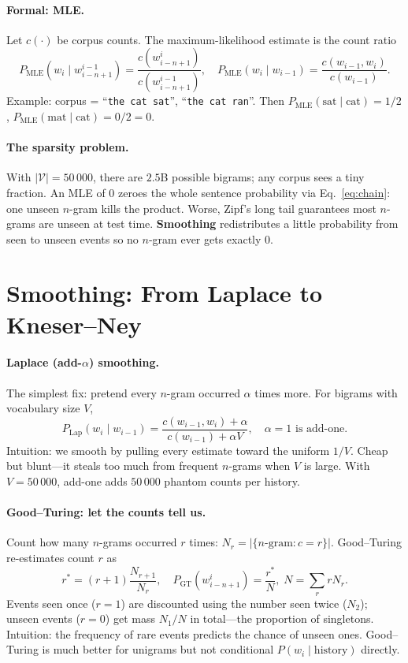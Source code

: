\paragraph{Formal: MLE.} Let $c(\cdot)$ be corpus counts. The maximum-likelihood estimate is the count ratio
\begin{equation}
P_{\text{MLE}}(w_{i}\mid w_{i-n+1}^{i-1})=\frac{c(w_{i-n+1}^{i})}{c(w_{i-n+1}^{i-1})},\quad
P_{\text{MLE}}(w_{i}\mid w_{i-1})=\frac{c(w_{i-1},w_{i})}{c(w_{i-1})}.
\label{eq:mle-ngram}
\end{equation}
Example: corpus = ``\texttt{the cat sat}'', ``\texttt{the cat ran}''. Then $P_{\text{MLE}}(\text{sat}\mid\text{cat})=1/2$, $P_{\text{MLE}}(\text{mat}\mid\text{cat})=0/2=0$.
\paragraph{The sparsity problem.} With $|\mathcal{V}|=50\,000$, there are $2.5$B possible bigrams; any corpus sees a tiny fraction. An MLE of $0$ zeroes the whole sentence probability via Eq.~\eqref{eq:chain}: one unseen $n$-gram kills the product. Worse, Zipf's long tail guarantees most $n$-grams are unseen at test time. \textbf{Smoothing} redistributes a little probability from seen to unseen events so no $n$-gram ever gets exactly $0$.
\section{Smoothing: From Laplace to Kneser--Ney}\label{sec:smoothing}
\paragraph{Laplace (add-$\alpha$) smoothing.} The simplest fix: pretend every $n$-gram occurred $\alpha$ times more. For bigrams with vocabulary size $V$,
\begin{equation}
P_{\text{Lap}}(w_{i}\mid w_{i-1})=\frac{c(w_{i-1},w_{i})+\alpha}{c(w_{i-1})+\alpha V},\quad \alpha=1\text{ is add-one.}
\label{eq:laplace}
\end{equation}
Intuition: we smooth by pulling every estimate toward the uniform $1/V$. Cheap but blunt---it steals too much from frequent $n$-grams when $V$ is large. With $V=50\,000$, add-one adds $50\,000$ phantom counts per history.
\paragraph{Good--Turing: let the counts tell us.} Count how many $n$-grams occurred $r$ times: $N_{r}=|\{n\text{-gram}:c=r\}|$. Good--Turing re-estimates count $r$ as
\begin{equation}
r^{*}=(r+1)\frac{N_{r+1}}{N_{r}},\quad P_{\text{GT}}(w_{i-n+1}^{i})=\frac{r^{*}}{N},\; N=\sum_{r}rN_{r}.
\label{eq:good-turing}
\end{equation}
Events seen once ($r=1$) are discounted using the number seen twice ($N_{2}$); unseen events ($r=0$) get mass $N_{1}/N$ in total---the proportion of singletons. Intuition: the frequency of rare events predicts the chance of unseen ones. Good--Turing is much better for unigrams but not conditional $P(w_{i}\mid\text{history})$ directly.
